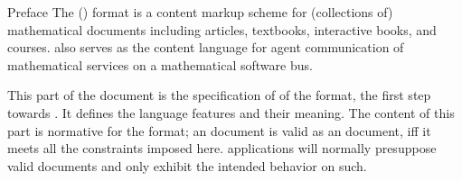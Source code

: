 
\begin{omgroup}[id=preface,display=flow]{Preface}
 The {\omdoc} (\explainomdocacronym) format is a content markup scheme for (collections of)
mathematical documents including articles, textbooks, interactive books, and courses.
{\omdoc} also serves as the content language for agent communication of mathematical
services on a mathematical software bus.

This {\ifbook part of the {\report}\else document\fi} is the specification of {}
of the {\omdoc} format, the first step towards {}. It defines the {\omdoc}
language features and their meaning. The content of this part is normative for the
{\omdoc} format; an {\omdoc} document is valid as an {\omdoc} document, iff it meets all
the constraints imposed here. {\omdoc} applications will normally presuppose valid
{\omdoc} documents and only exhibit the intended behavior on such.
\end{omgroup}




